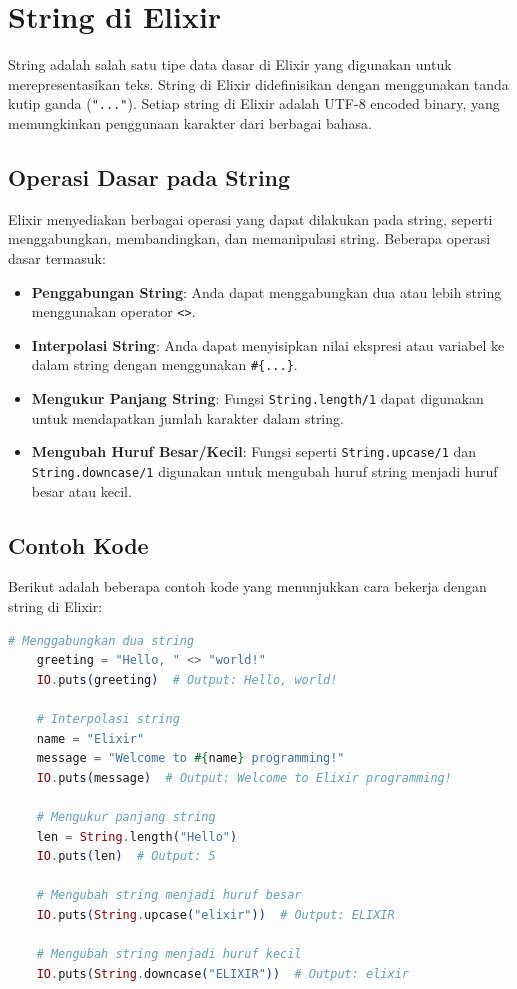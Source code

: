\section{String di Elixir}

String adalah salah satu tipe data dasar di Elixir yang digunakan untuk merepresentasikan teks. String di Elixir didefinisikan dengan menggunakan tanda kutip ganda (\texttt{"..."}). Setiap string di Elixir adalah UTF-8 encoded binary, yang memungkinkan penggunaan karakter dari berbagai bahasa.

\subsection{Operasi Dasar pada String}

Elixir menyediakan berbagai operasi yang dapat dilakukan pada string, seperti menggabungkan, membandingkan, dan memanipulasi string. Beberapa operasi dasar termasuk:

\begin{itemize}
	\item \textbf{Penggabungan String}: Anda dapat menggabungkan dua atau lebih string menggunakan operator \texttt{<>}.
	\item \textbf{Interpolasi String}: Anda dapat menyisipkan nilai ekspresi atau variabel ke dalam string dengan menggunakan \texttt{\#\{...\}}.
	\item \textbf{Mengukur Panjang String}: Fungsi \texttt{String.length/1} dapat digunakan untuk mendapatkan jumlah karakter dalam string.
	\item \textbf{Mengubah Huruf Besar/Kecil}: Fungsi seperti \texttt{String.upcase/1} dan \texttt{String.downcase/1} digunakan untuk mengubah huruf string menjadi huruf besar atau kecil.
\end{itemize}

\subsection{Contoh Kode}

Berikut adalah beberapa contoh kode yang menunjukkan cara bekerja dengan string di Elixir:

\begin{lstlisting}[language=Elixir]
	# Menggabungkan dua string
	greeting = "Hello, " <> "world!"
	IO.puts(greeting)  # Output: Hello, world!
	
	# Interpolasi string
	name = "Elixir"
	message = "Welcome to #{name} programming!"
	IO.puts(message)  # Output: Welcome to Elixir programming!
	
	# Mengukur panjang string
	len = String.length("Hello")
	IO.puts(len)  # Output: 5
	
	# Mengubah string menjadi huruf besar
	IO.puts(String.upcase("elixir"))  # Output: ELIXIR
	
	# Mengubah string menjadi huruf kecil
	IO.puts(String.downcase("ELIXIR"))  # Output: elixir
\end{lstlisting}

